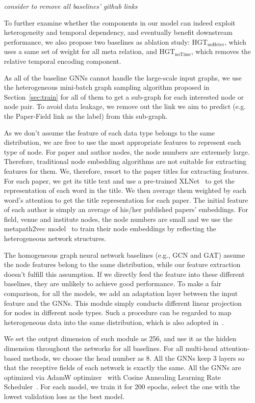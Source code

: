 \documentclass[sigconf]{acmart}
\theoremstyle{definition}
\newcommand{\yd}[1]{\textit{{\color{red}#1 }}}
\begin{document}
{\yd{consider to remove all baselines' github links}



To further examine whether the components in our model can indeed exploit heterogeneity and temporal dependency, and eventually benefit downstream performance, we also propose two baselines as ablation study:  HGT$_{\text{noHeter}}$, which uses a same set of weight for all meta relation, and HGT$_{\text{noTime}}$, which removes the relative temporal encoding component. 

As all of the baseline GNNs cannot handle the large-scale input graphs, we use 
the heterogeneous mini-batch graph sampling algorithm proposed in Section~\ref{sec:train} for all of them to get a sub-graph for each interested node or node pair. 
To avoid data leakage, we remove out the link we aim to predict (e.g. the Paper-Field link as the label) from this sub-graph.

As we don't assume the feature of each data type belongs to the same distribution, we are free to use the most appropriate features to represent each type of node. 
For paper and author nodes, the node numbers are extremely large. Therefore, traditional node embedding algorithms are not suitable for extracting features for them. 
We, therefore, resort to the paper titles for extracting features. For each paper, we get its title text and use a pre-trained XLNet~\cite{xlnet, wolf2019transformers} to get the representation of each word in the title. We then average them weighted by each word's attention to get the title representation for each paper. The initial feature of each author is simply an average of his/her published papers' embeddings. For field, venue and institute nodes, the node numbers are small and we use the metapath2vec model~\cite{dong2017metapath2vec} to train their node embeddings by reflecting the heterogeneous network structures. 


The homogeneous graph neural network baselines (e.g., GCN and GAT) assume the node features belong to the same distribution, while our feature extraction doesn't fulfill this assumption. 
If we directly feed the feature into these different baselines, they are unlikely to achieve good performance. 
To make a fair comparison, for all the models, we add an adaptation layer between the input feature and the GNNs. This module simply conducts different linear projection for nodes in different node types. Such a procedure can be regarded to map heterogeneous data into the same distribution, which is also adopted in~\cite{DBLP:conf/kdd/ZhangSHSC19, DBLP:conf/www/WangJSWYCY19}. 

We set the output dimension of such module as 256, and use it as the hidden dimension throughout the networks for all baselines. For all multi-head attention-based methods, we choose the head number as 8. All the GNNs keep 3 layers so that the receptive fields of each network is exactly the same. All the GNNs are optimized via AdamW optimizer~\cite{DBLP:conf/iclr/LoshchilovH19} with Cosine Annealing Learning Rate Scheduler~\cite{DBLP:conf/iclr/LoshchilovH17}. For each model, we train it for 200 epochs, select the one with the lowest validation loss as the best model. 
} 
\end{document}
